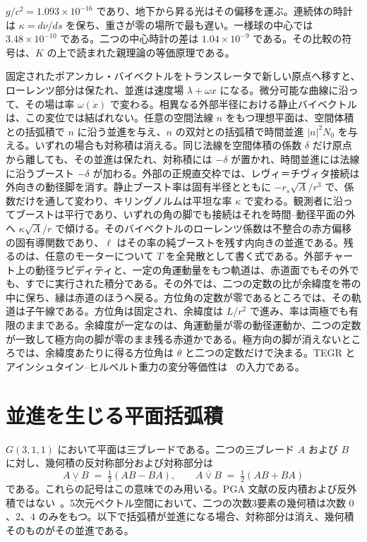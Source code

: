 \documentclass[a4paper]{article}
\begin{document}
\(g/c^{2}=1.093\times 10^{-16}\) であり、地下から昇る光はその偏移を運ぶ。連続体の時計は \(\kappa=d\nu/ds\) を保ち、重さが零の場所で最も遅い。一様球の中心では \(3.48\times 10^{-10}\) である。二つの中心時計の差は \(1.04\times 10^{-9}\) である。その比較の符号は、\(K\) の上で読まれた親理論の等価原理である。

固定されたポアンカレ・バイベクトルをトランスレータで新しい原点へ移すと、ローレンツ部分は保たれ、並進は速度場 \(\lambda+\omega x\) になる。微分可能な曲線に沿って、その場は率 \(\omega(\dot{x})\) で変わる。相異なる外部半径における静止バイベクトルは、この変位では結ばれない。任意の空間法線 \(n\) をもつ理想平面は、空間体積との括弧積で \(n\) に沿う並進を与え、\(n\) の双対との括弧積で時間並進 \(|n|^{2}N_{0}\) を与える。いずれの場合も対称積は消える。同じ法線を空間体積の係数 \(\delta\) だけ原点から離しても、その並進は保たれ、対称積には \(-\delta\) が置かれ、時間並進には法線に沿うブースト \(-\delta\) が加わる。外部の正規直交枠では、レヴィ＝チヴィタ接続は外向きの動径脚を消す。静止ブースト率は固有半径とともに \(-r_{s}\sqrt{A}/r^{3}\) で、係数だけを通して変わり、キリングノルムは平坦な率 \(\kappa\) で変わる。観測者に沿ってブーストは平行であり、いずれの角の脚でも接続はそれを時間--動径平面の外へ \(\kappa\sqrt{A}/r\) で傾ける。そのバイベクトルのローレンツ係数は不整合の赤方偏移の固有導関数であり、\(\ell\) はその率の純ブーストを残す内向きの並進である。残るのは、任意のモーターについて \(T\) を全発散として書く式である。外部チャート上の動径ラピディティと、一定の角運動量をもつ軌道は、赤道面でもその外でも、すでに実行された積分である。その外では、二つの定数の比が余緯度を帯の中に保ち、縁は赤道のほうへ戻る。方位角の定数が零であるところでは、その軌道は子午線である。方位角は固定され、余緯度は \(L/r^{2}\) で進み、率は両極でも有限のままである。余緯度が一定なのは、角運動量が零の動径運動か、二つの定数が一致して極方向の脚が零のまま残る赤道かである。極方向の脚が消えないところでは、余緯度あたりに得る方位角は \(\theta\) と二つの定数だけで決まる。TEGR とアインシュタイン--ヒルベルト重力の変分等価性は~\cite{maluf2013} の入力である。

\appendix

\section{並進を生じる平面括弧積}
\label{app:bracket}

\(G(3,1,1)\) において平面は三ブレードである。二つの三ブレード \(A\) および \(B\) に対し、幾何積の反対称部分および対称部分は
\[
A \mathbin{\underline{\vee}} B \;=\; \tfrac12(AB-BA),\qquad
A \mathbin{\overline{\vee}} B \;=\; \tfrac12(AB+BA)
\]
である。これらの記号はこの意味でのみ用いる。PGA 文献の反内積および反外積ではない~\cite{Lengyel2024,DorstFontijneMann2007}。5次元ベクトル空間において、二つの次数3要素の幾何積は次数 \(0\)、\(2\)、\(4\) のみをもつ。以下で括弧積が並進になる場合、対称部分は消え、幾何積そのものがその並進である。
\end{document}
